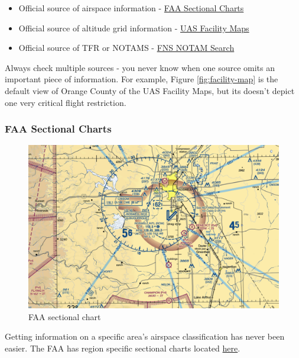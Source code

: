 \documentclass[
  12pt,
]{book}
\providecommand{\tightlist}{%
  \setlength{\itemsep}{0pt}\setlength{\parskip}{0pt}}
\newenvironment{notebox}{
  \definecolor{shadecolor}{gray}{.8}  %
  \color{black}
  \begin{shaded}}
 {\end{shaded}}
\begin{document}
\begin{itemize}
\tightlist
\item
  Official source of airspace information - \href{https://www.faa.gov/air_traffic/flight_info/aeronav/digital_products/vfr/}{FAA Sectional Charts}
\item
  Official source of altitude grid information - \href{https://faa.maps.arcgis.com/apps/webappviewer/index.html?id=9c2e4406710048e19806ebf6a06754ad}{UAS Facility Maps}
\item
  Official source of TFR or NOTAMS - \href{https://notams.aim.faa.gov/notamSearch/nsapp.html\#/}{FNS NOTAM Search}
\end{itemize}

\begin{notebox}
Always check multiple sources - you never know when one source omits an important piece of information. For example, Figure \ref{fig:facility-map} is the default view of Orange County of the UAS Facility Maps, but its doesn't depict one very critical flight restriction.

\end{notebox}

\hypertarget{faa-sectional-charts}{%
\subsubsection{FAA Sectional Charts}\label{faa-sectional-charts}}

\begin{figure}
\centering
\includegraphics{images/FAA-VFR.png}
\caption{FAA sectional chart}
\end{figure}

Getting information on a specific area's airspace classification has never been easier. The FAA has region specific sectional charts located \href{https://www.faa.gov/air_traffic/flight_info/aeronav/digital_products/vfr/}{here}.
\end{document}
